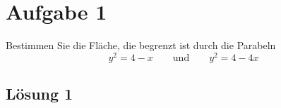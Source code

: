 \documentclass[main.tex]{subfiles}
\begin{document}
\section{Aufgabe 1}
Bestimmen Sie die Fläche, die begrenzt ist durch die Parabeln
\[
    y^2 = 4 - x 
    \qquad \mbox{und} \qquad
    y^2 = 4 - 4x
\]

\subsection{Lösung 1}
\end{document}
